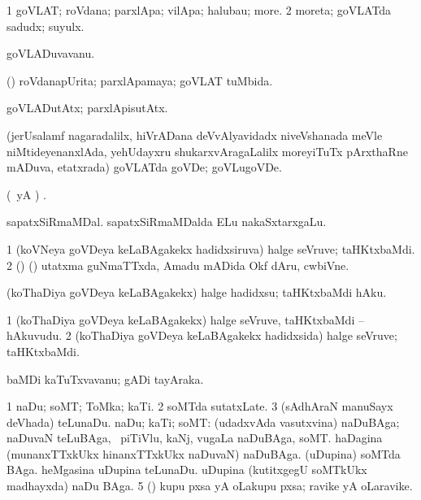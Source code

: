 \bentry
{} 
\gl{\nA}
\expl{}
\bmng
\bnum
\num{1} goVLAT; roVdana; parxlApa; vilApa; halubau; more. 
\num{2} moreta; goVLATda sadudx; suyulx. 
\enum
\emng
\eentry

\bentry
{} 
\gl{\nA}
\bmng
goVLADuvavanu. 
\emng
\eentry

\bentry
{} 
\gl{\gu}
\expl{}
\bmng
(\kAparx) roVdanapUrita; parxlApamaya; goVLAT tuMbida. 
\emng
\eentry

\bentry
{} 
\gl{\kirxvi}
\expl{}
\bmng
goVLADutAtx; parxlApisutAtx. 
\emng
\eentry

\bentry
{} 
\gl{\nA}
\expl{}
\bmng
(jerUsalamf nagaradalilx, hiVrADana deVvAlyavidadx niveVshanada meVle niMtideyenanxlAda, yehUdayxru shukarxvAragaLalilx moreyiTuTx pArxthaRne mADuva, etatxrada) goVLATda goVDe; goVLugoVDe. 
\emng
\eentry

\bentry
{} 
\gl{\nA}
\expl{}
\bmng
(\kAparx\ yA \pArxM) . 
\emng

\noindent 
\gl{\pagu}
\expl{}
\bmng
{} 
\banum
{} sapatxSiRmaMDal. 
 sapatxSiRmaMDalda ELu nakaSxtarxgaLu. 
\eanum
\emng
\eentry

\bentry
{} 
\gl{\nA}
\expl{}
\bmng
\bnum
\num{1} (koVNeya goVDeya keLaBAgakekx hadidxsiruva) halge seVruve; taHKtxbaMdi. 
\num{2} (\ca) (\birx) utatxma guNmaTTxda, Amadu mADida Okf dAru, cwbiVne. 
\enum
\emng
\eentry

\bentry
{} 
\gl{\sakirx}
\bmng
(koThaDiya goVDeya keLaBAgakekx) halge hadidxsu; taHKtxbaMdi hAku. 
\emng
\eentry

\bentry
{} 
\gl{\nA}
\expl{}
\bmng
\bnum
\num{1} (koThaDiya goVDeya keLaBAgakekx) halge seVruve, taHKtxbaMdi -- hAkuvudu. 
\num{2} (koThaDiya goVDeya keLaBAgakekx hadidxsida) halge seVruve; taHKtxbaMdi. 
\enum
\emng
\eentry

\bentry
{} 
\gl{\nA}
\expl{}
\bmng
baMDi kaTuTxvavanu; gADi tayAraka. 
\emng
\eentry

\bentry
{} 
\gl{\nA}
\bmng
\bnum
\num{1} naDu; soMT; ToMka; kaTi. 
\num{2} soMTda sutatxLate. 
\num{3} (sAdhAraN manuSayx deVhada) teLunaDu. 
 naDu; kaTi; soMT: 
\banum
{} (udadxvAda vasutxvina) naDuBAga; naDuvaN teLuBAga, \udA\ piTiVlu, kaNj, \mo vugaLa naDuBAga, soMT. 
 haDagina (munanxTTxkUkx hinanxTTxkUkx naDuvaN) naDuBAga. 
 (uDupina) soMTda BAga. 
 heMgasina uDupina teLunaDu. 
 uDupina (kutitxgegU soMTkUkx madhayxda) naDu BAga. 
\eanum
\numie
\num{5} (\ame) kupu pxsa yA oLakupu pxsa; ravike yA oLaravike. 
\enum
\emng
\eentry

